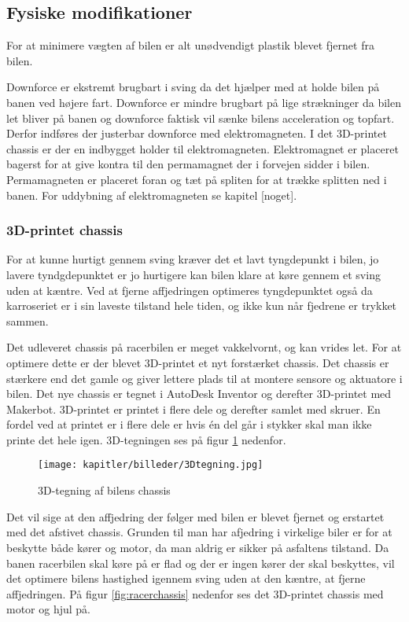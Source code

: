 \newpage
\subsection{Fysiske modifikationer}

For at minimere vægten af bilen er alt unødvendigt plastik blevet fjernet fra bilen.

Downforce er ekstremt brugbart i sving da det hjælper med at holde bilen på banen ved højere fart. Downforce er mindre brugbart på lige strækninger da bilen let bliver på banen og downforce faktisk vil sænke bilens acceleration og topfart. Derfor indføres der justerbar downforce med elektromagneten. I det 3D-printet chassis er der en indbygget holder til elektromagneten. Elektromagnet er placeret bagerst for at give kontra til den permamagnet der i forvejen sidder i bilen. Permamagneten er placeret foran og tæt på spliten for at trække splitten ned i banen. For uddybning af elektromagneten se kapitel [noget].

\subsubsection{3D-printet chassis}

For at kunne hurtigt gennem sving kræver det et lavt tyngdepunkt i bilen, jo lavere tyndgdepunktet er jo hurtigere kan bilen klare at køre gennem et sving uden at kæntre. Ved at fjerne affjedringen optimeres tyngdepunktet også da karroseriet er i sin laveste tilstand hele tiden, og ikke kun når fjedrene er trykket sammen.

Det udleveret chassis på racerbilen er meget vakkelvornt, og kan vrides let. For at optimere dette er der blevet 3D-printet et nyt forstærket chassis. Det chassis er stærkere end det gamle og giver lettere plads til at montere sensore og aktuatore i bilen. Det nye chassis er tegnet i AutoDesk Inventor og derefter 3D-printet med Makerbot. 3D-printet er printet i flere dele og derefter samlet med skruer. En fordel ved at printet er i flere dele er hvis én del går i stykker skal man ikke printe det hele igen. 3D-tegningen ses på figur \ref{fig:3Dtegning} nedenfor.

\begin{figure}[ht]
    \centering
    \texttt{[image: kapitler/billeder/3Dtegning.jpg]}
    \caption{3D-tegning af bilens chassis}
    \label{fig:3Dtegning}
\end{figure}


Det vil sige at den affjedring der følger med bilen er blevet fjernet og erstartet med det afstivet chassis. Grunden til man har afjedring i virkelige biler er for at beskytte både kører og motor, da man aldrig er sikker på asfaltens tilstand. Da banen racerbilen skal køre på er flad og der er ingen kører der skal beskyttes, vil det optimere bilens hastighed igennem sving uden at den kæntre, at fjerne affjedringen. På figur \ref{fig:racerchassis} nedenfor ses det 3D-printet chassis med motor og hjul på.


